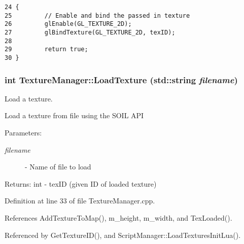 \begin{Code}\begin{verbatim}24 {
25         // Enable and bind the passed in texture
26         glEnable(GL_TEXTURE_2D);
27         glBindTexture(GL_TEXTURE_2D, texID);
28 
29         return true;
30 }
\end{verbatim}
\end{Code}


\hypertarget{class_texture_manager_f36ff195338c11f9e39e0b773d7c71e2}{
\subsubsection[LoadTexture]{\setlength{\rightskip}{0pt plus 5cm}int TextureManager::LoadTexture (std::string {\em filename})}}
\label{class_texture_manager_f36ff195338c11f9e39e0b773d7c71e2}


Load a texture. 

Load a texture from file using the SOIL API

\begin{Desc}
\item[Parameters:]
\begin{description}
\item[{\em filename}]- Name of file to load\end{description}
\end{Desc}
\begin{Desc}
\item[Returns:]int - texID (given ID of loaded texture) \end{Desc}


Definition at line 33 of file TextureManager.cpp.

References AddTextureToMap(), m\_\-height, m\_\-width, and TexLoaded().

Referenced by GetTextureID(), and ScriptManager::LoadTexturesInitLua().

